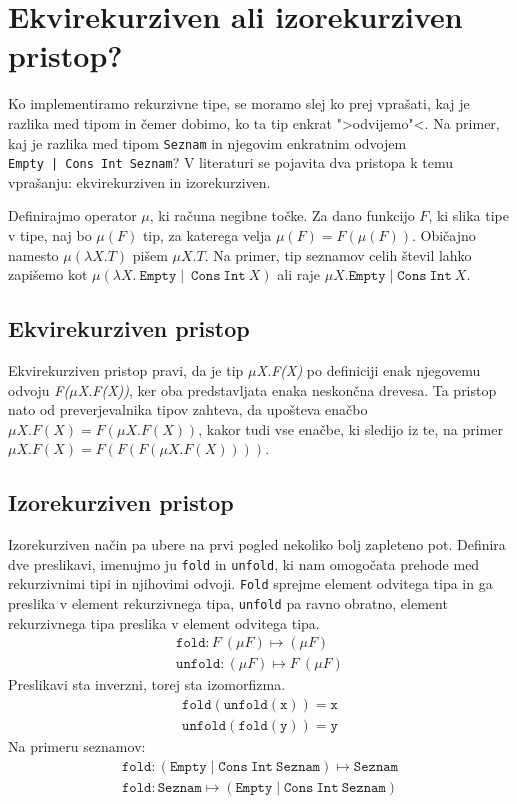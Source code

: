 \documentclass[a4paper,12pt,openright]{book}
\begin{document}
\section{Ekvirekurziven ali izorekurziven pristop?}
Ko implementiramo rekurzivne tipe, se moramo slej ko prej vprašati, kaj je razlika med tipom in čemer dobimo, ko ta tip enkrat ">odvijemo"<. Na primer, kaj je razlika med tipom \lstinline{Seznam}
in njegovim enkratnim odvojem \\ \lstinline{Empty | Cons Int Seznam}? V literaturi  se pojavita dva pristopa k temu vprašanju: ekvirekurziven in izorekurziven.

Definirajmo operator $\mu$, ki računa negibne točke. Za dano funkcijo $F$, ki slika tipe v tipe, naj bo $\mu(F)$ tip, za katerega velja $\mu(F) = F(\mu(F))$. Običajno namesto $\mu (\lambda X. T)$ 
pišem $\mu X. T$. Na primer, tip seznamov celih števil lahko zapišemo kot $\mu (\lambda X. \ \mathtt{Empty} \mid \ \mathtt{Cons} \ \mathtt{Int} \ X)$ ali raje $\mu X. \mathtt{Empty} \mid \mathtt{Cons} \ \mathtt{Int} \ X$.

\subsection{Ekvirekurziven pristop}
Ekvirekurziven pristop pravi, da je tip \emph{\(\mu\)X.F(X)} po definiciji enak njegovemu odvoju \emph{F(\(\mu\)X.F(X))}, ker oba predstavljata enaka neskončna drevesa. Ta pristop nato od 
preverjevalnika tipov zahteva, da upošteva enačbo $\mu X . F(X) = F(\mu X . F(X))$, kakor tudi vse enačbe, ki sledijo iz te, na primer $\mu X. F(X) = F(F(F(\mu X . F(X))))$. 

\subsection{Izorekurziven pristop}
Izorekurziven način pa ubere na prvi pogled nekoliko bolj zapleteno pot. Definira dve preslikavi, imenujmo ju \lstinline{fold} in \lstinline{unfold}, ki nam omogočata prehode med rekurzivnimi tipi in njihovimi odvoji. 
\lstinline{Fold} sprejme element odvitega tipa in ga preslika v element rekurzivnega tipa, \lstinline{unfold} pa ravno obratno, element rekurzivnega tipa preslika v element odvitega tipa.
\begin{align*}
    \mathtt{fold} : F \ (\mu F) \mapsto (\mu F)\\
    \mathtt{unfold} : (\mu F) \mapsto F \ (\mu F)
\end{align*}
Preslikavi sta inverzni, torej sta izomorfizma.
\begin{align*}
  \mathtt{fold(unfold(x)) = x}\\
  \mathtt{unfold(fold(y)) = y}
\end{align*}
Na primeru seznamov:
\begin{align*}
  \mathtt{fold} : (\mathtt{Empty} \mid \mathtt{Cons} \ \mathtt{Int} \ \mathtt{Seznam}) \mapsto \mathtt{Seznam}\\
  \mathtt{fold} : \mathtt{Seznam} \mapsto (\mathtt{Empty} \mid \mathtt{Cons} \ \mathtt{Int} \ \mathtt{Seznam})
\end{align*}
\end{document}
